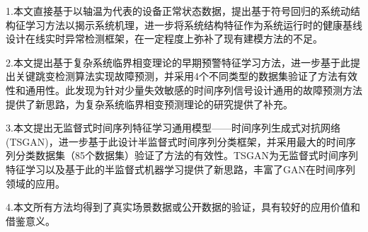 1.本文直接基于以轴温为代表的设备正常状态数据，提出基于符号回归的系统动结构征学习方法以揭示系统机理，进一步将系统结构特征作为系统运行时的健康基线设计在线实时异常检测框架，在一定程度上弥补了现有建模方法的不足。

2.本文提出基于复杂系统临界相变理论的早期预警特征学习方法，进一步基于此提出关键跳变检测算法实现故障预测，并采用4个不同类型的数据集验证了方法有效性和通用性。此发现为针对少量失效敏感的时间序列信号设计通用的故障预测方法提供了新思路，为复杂系统临界相变预测理论的研究提供了补充。

3.本文提出无监督式时间序列特征学习通用模型——时间序列生成式对抗网络(TSGAN)，进一步基于此设计半监督式时间序列分类框架，并采用最大的时间序列分类数据集（85个数据集）验证了方法的有效性。TSGAN为无监督式时间序列特征学习以及基于此的半监督式机器学习提供了新思路，丰富了GAN在时间序列领域的应用。

4.本文所有方法均得到了真实场景数据或公开数据的验证，具有较好的应用价值和借鉴意义。


